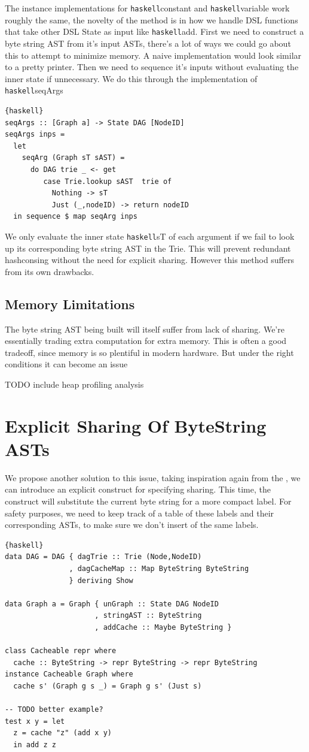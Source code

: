 \documentclass[runningheads]{llncs}
\begin{document}
The instance implementations for \lstinline{haskell}{constant} and
\lstinline{haskell}{variable} work roughly the same, the novelty of the method
is in how we handle DSL functions that take other DSL State as input like
\lstinline{haskell}{add}. First we need to construct a byte string AST from
it's input ASTs, there's a lot of ways we could go about this to attempt to
minimize memory. A naive implementation would look similar to a pretty printer.
Then we need to sequence it's inputs without evaluating the inner state if
unnecessary. We do this through the implementation of \lstinline{haskell}{seqArgs}
\begin{lstlisting}{haskell}
seqArgs :: [Graph a] -> State DAG [NodeID]
seqArgs inps =
  let
    seqArg (Graph sT sAST) =
      do DAG trie _ <- get
         case Trie.lookup sAST  trie of
           Nothing -> sT
           Just (_,nodeID) -> return nodeID
  in sequence $ map seqArg inps
\end{lstlisting}

We only evaluate the inner state \lstinline{haskell}{sT} of each argument if we
fail to look up its corresponding byte string AST in the Trie. This will prevent
redundant hashconsing without the need for explicit sharing. However this method
suffers from its own drawbacks.

\subsection{Memory Limitations}
The byte string AST being built will itself suffer from lack of sharing. We're
essentially trading extra computation for extra memory. This is often a good
tradeoff, since memory is so plentiful in modern hardware. But under the right
conditions it can become an issue

TODO include heap profiling analysis

\section{Explicit Sharing Of ByteString ASTs}
We propose another solution to this issue, taking inspiration again from the
\cite{kiselyov:sharing}, we can introduce an explicit construct for specifying
sharing. This time, the construct will substitute the current byte string for a
more compact label. For safety purposes, we need to keep track of a table of
these labels and their corresponding ASTs, to make sure we don't insert of the
same labels.
\begin{lstlisting}{haskell}
data DAG = DAG { dagTrie :: Trie (Node,NodeID)
               , dagCacheMap :: Map ByteString ByteString
               } deriving Show

data Graph a = Graph { unGraph :: State DAG NodeID
                     , stringAST :: ByteString
                     , addCache :: Maybe ByteString }

class Cacheable repr where
  cache :: ByteString -> repr ByteString -> repr ByteString
instance Cacheable Graph where
  cache s' (Graph g s _) = Graph g s' (Just s)

-- TODO better example?
test x y = let
  z = cache "z" (add x y)
  in add z z
\end{lstlisting}
\end{document}
